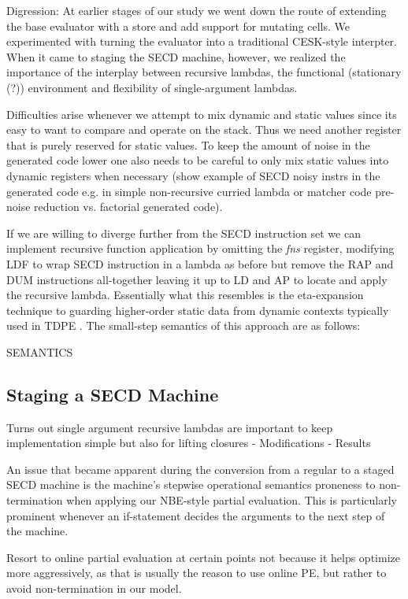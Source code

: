 \documentclass[fleqn]{article}
\theoremstyle{definition}
\begin{document}

Digression:
At earlier stages of our study we went down the route of extending the base evaluator with a store and add support for mutating cells. We experimented with turning the evaluator into a traditional CESK-style interpter. When it came to staging the SECD machine, however, we realized the importance of the interplay between recursive lambdas, the functional (stationary (?)) environment and flexibility of single-argument lambdas.

Difficulties arise whenever we attempt to mix dynamic and static values since its easy to want to compare and operate on the stack. Thus we need another register that is purely reserved for static values. To keep the amount of noise in the generated code lower one also needs to be careful to only mix static values into dynamic registers when necessary (show example of SECD noisy instrs in the generated code e.g. in simple non-recursive curried lambda or matcher code pre-noise reduction vs. factorial generated code).

If we are willing to diverge further from the SECD instruction set we can implement recursive function application by omitting the \textit{fns} register, modifying LDF to wrap SECD instruction in a lambda as before but remove the RAP and DUM instructions all-together leaving it up to LD and AP to locate and apply the recursive lambda. Essentially what this resembles is the eta-expansion technique to guarding higher-order static data from dynamic contexts typically used in TDPE \cite{danvy1995essence}. The small-step semantics of this approach are as follows:

SEMANTICS

\subsection{Staging a SECD Machine}
Turns out single argument recursive lambdas are important to keep implementation simple but also for lifting closures
- Modifications
- Results

An issue that became apparent during the conversion from a regular to a staged SECD machine is the machine's stepwise operational semantics proneness to non-termination when applying our NBE-style partial evaluation. This is particularly prominent whenever an if-statement decides the arguments to the next step of the machine.

Resort to online partial evaluation at certain points not because it helps optimize more aggressively, as that is usually the reason to use online PE, but rather to avoid non-termination in our model.
\end{document}
